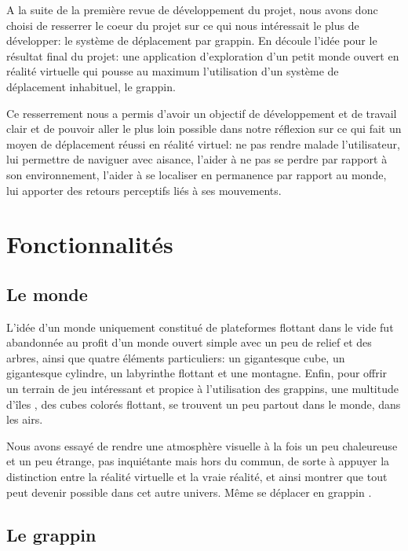 \documentclass[a4paper]{elsarticle}
\begin{document}
A la suite de la première revue de développement du projet, nous avons donc choisi de resserrer le coeur du projet sur ce qui nous intéressait le plus de développer: le système de déplacement par grappin. En découle l’idée pour le résultat final du projet: une application d’exploration d’un petit monde ouvert en réalité virtuelle qui pousse au maximum l’utilisation d’un système de déplacement inhabituel, le grappin.
    
Ce resserrement nous a permis d’avoir un objectif de développement et de travail clair et de pouvoir aller le plus loin possible dans notre réflexion sur ce qui fait un moyen de déplacement réussi en réalité virtuel: ne pas rendre malade l’utilisateur, lui permettre de naviguer avec aisance, l’aider à ne pas se perdre par rapport à son environnement, l’aider à se localiser en permanence par rapport au monde, lui apporter des retours perceptifs liés à ses mouvements.


\section{Fonctionnalités}
\subsection{Le monde}

L’idée d’un monde uniquement constitué de plateformes flottant dans le vide fut abandonnée au profit d’un monde ouvert simple avec un peu de relief et des arbres, ainsi que quatre éléments particuliers: un gigantesque cube, un gigantesque cylindre, un labyrinthe flottant et une montagne. Enfin, pour offrir un terrain de jeu intéressant et propice à l’utilisation des grappins, une multitude d’\og îles \fg{}, des cubes colorés flottant, se trouvent un peu partout dans le monde, dans les airs.
    
Nous avons essayé de rendre une atmosphère visuelle à la fois un peu chaleureuse et un peu étrange, pas inquiétante mais hors du commun, de sorte à appuyer la distinction entre la réalité virtuelle et la  \og vraie \fg{}  réalité, et ainsi montrer que tout peut devenir possible dans cet autre univers. Même se déplacer en  \og grappin \fg{} .

\subsection{Le grappin}
\end{document}
